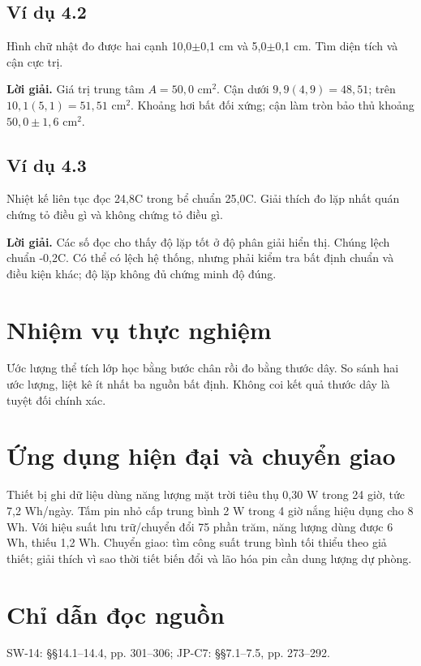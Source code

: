 \documentclass[11pt,a4paper,openany]{book}
\begin{document}
\subsection*{Ví dụ 4.2}
Hình chữ nhật đo được hai cạnh 10,0\ensuremath{\pm}0,1 cm và 5,0\ensuremath{\pm}0,1 cm. Tìm diện tích và cận cực trị.

\textbf{Lời giải.} Giá trị trung tâm $A=50{,}0$ cm$^2$. Cận dưới $9{,}9(4{,}9)=48{,}51$; trên $10{,}1(5{,}1)=51{,}51$ cm$^2$. Khoảng hơi bất đối xứng; cận làm tròn bảo thủ khoảng $50{,}0\pm1{,}6$ cm$^2$.
\subsection*{Ví dụ 4.3}
Nhiệt kế liên tục đọc 24,8\textdegree{}C trong bể chuẩn 25,0\textdegree{}C. Giải thích đo lặp nhất quán chứng tỏ điều gì và không chứng tỏ điều gì.

\textbf{Lời giải.} Các số đọc cho thấy độ lặp tốt ở độ phân giải hiển thị. Chúng lệch chuẩn -0,2\textdegree{}C. Có thể có lệch hệ thống, nhưng phải kiểm tra bất định chuẩn và điều kiện khác; độ lặp không đủ chứng minh độ đúng.
\section{Nhiệm vụ thực nghiệm}
Ước lượng thể tích lớp học bằng bước chân rồi đo bằng thước dây. So sánh hai ước lượng, liệt kê ít nhất ba nguồn bất định. Không coi kết quả thước dây là tuyệt đối chính xác.
\section{Ứng dụng hiện đại và chuyển giao}
Thiết bị ghi dữ liệu dùng năng lượng mặt trời tiêu thụ 0,30 W trong 24 giờ, tức 7,2 Wh/ngày. Tấm pin nhỏ cấp trung bình 2 W trong 4 giờ nắng hiệu dụng cho 8 Wh. Với hiệu suất lưu trữ/chuyển đổi 75 phần trăm, năng lượng dùng được 6 Wh, thiếu 1,2 Wh. Chuyển giao: tìm công suất trung bình tối thiểu theo giả thiết; giải thích vì sao thời tiết biến đổi và lão hóa pin cần dung lượng dự phòng.
\section{Chỉ dẫn đọc nguồn}
SW-14: §§14.1–14.4, pp. 301–306; JP-C7: §§7.1–7.5, pp. 273–292.
\end{document}
